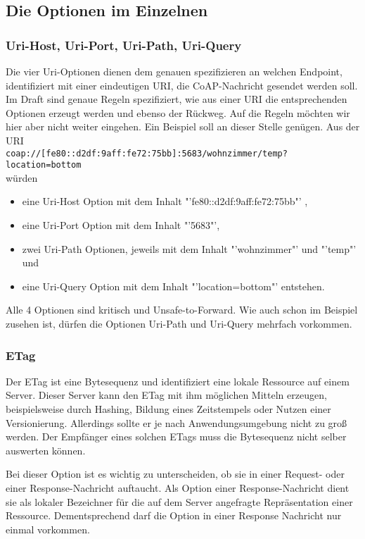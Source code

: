 \subsection{Die Optionen im Einzelnen}
\subsubsection{Uri-Host, Uri-Port, Uri-Path, Uri-Query}
\label{option:urioptions}
Die vier Uri-Optionen dienen dem genauen spezifizieren an welchen Endpoint,
identifiziert mit einer eindeutigen URI, die CoAP-Nachricht gesendet werden
soll. Im Draft sind genaue Regeln spezifiziert, wie aus einer URI die
entsprechenden Optionen erzeugt werden und ebenso der Rückweg. Auf die Regeln
möchten wir hier aber nicht weiter eingehen. Ein Beispiel soll an dieser Stelle genügen. Aus der
URI\\
\verb!coap://[fe80::d2df:9aff:fe72:75bb]:5683/wohnzimmer/temp?location=bottom!\\
würden
\begin{itemize}
  \item eine Uri-Host Option mit dem Inhalt "'fe80::d2df:9aff:fe72:75bb"' ,
  \item eine Uri-Port Option mit dem Inhalt "'5683"',
  \item zwei Uri-Path Optionen, jeweils mit dem Inhalt "'wohnzimmer"' und "'temp"' und
  \item eine Uri-Query Option mit dem Inhalt "'location=bottom"' entstehen.
\end{itemize}   
Alle 4 Optionen sind kritisch und Unsafe-to-Forward. Wie auch schon im Beispiel
zusehen ist, dürfen die Optionen Uri-Path und Uri-Query mehrfach vorkommen.
\subsubsection{ETag}
\label{option:etag}
Der ETag ist eine Bytesequenz und identifiziert eine lokale Ressource auf einem
Server. Dieser Server kann den ETag mit ihm möglichen Mitteln erzeugen,
beispielsweise durch Hashing, Bildung eines Zeitstempels oder Nutzen einer
Versionierung. Allerdings sollte er je nach Anwendungsumgebung nicht
zu groß werden. Der Empfänger eines solchen ETags muss die Bytesequenz nicht
selber auswerten können.

Bei dieser Option ist es wichtig zu unterscheiden, ob sie in einer Request- oder
einer Response-Nachricht auftaucht. Als Option einer Response-Nachricht dient
sie als lokaler Bezeichner für die auf dem Server angefragte Repräsentation
einer Ressource. Dementsprechend darf die Option in einer Response Nachricht nur einmal vorkommen.


